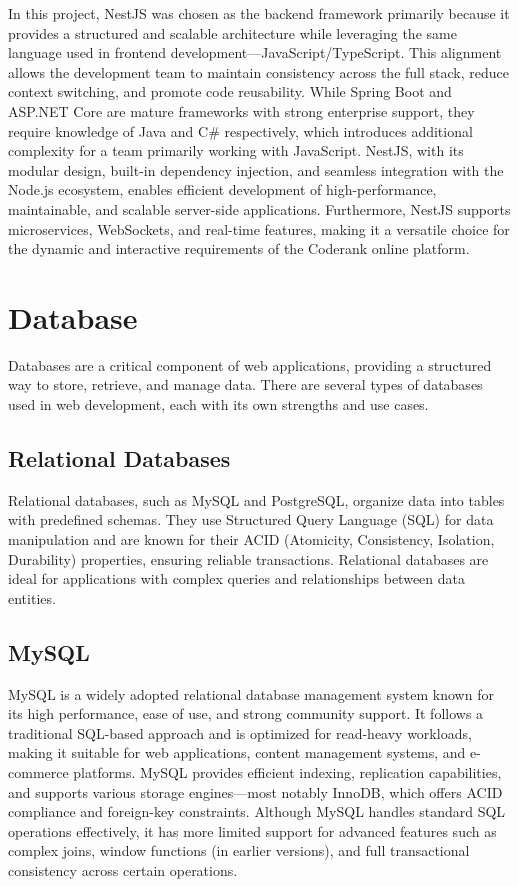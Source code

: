 In this project, NestJS was chosen as the backend framework primarily because it provides a structured and scalable architecture while leveraging the same language used in frontend development—JavaScript/TypeScript. This alignment allows the development team to maintain consistency across the full stack, reduce context switching, and promote code reusability. While Spring Boot and ASP.NET Core are mature frameworks with strong enterprise support, they require knowledge of Java and C\# respectively, which introduces additional complexity for a team primarily working with JavaScript. NestJS, with its modular design, built-in dependency injection, and seamless integration with the Node.js ecosystem, enables efficient development of high-performance, maintainable, and scalable server-side applications. Furthermore, NestJS supports microservices, WebSockets, and real-time features, making it a versatile choice for the dynamic and interactive requirements of the Coderank online platform.

\section{Database}

Databases are a critical component of web applications, providing a structured way to store, retrieve, and manage data. There are several types of databases used in web development, each with its own strengths and use cases.

\subsection{Relational Databases}

Relational databases, such as MySQL and PostgreSQL, organize data into tables with predefined schemas. They use Structured Query Language (SQL) for data manipulation and are known for their ACID (Atomicity, Consistency, Isolation, Durability) properties, ensuring reliable transactions. Relational databases are ideal for applications with complex queries and relationships between data entities.\\

\subsection*{MySQL}

MySQL is a widely adopted relational database management system known for its high performance, ease of use, and strong community support. It follows a traditional SQL-based approach and is optimized for read-heavy workloads, making it suitable for web applications, content management systems, and e-commerce platforms. MySQL provides efficient indexing, replication capabilities, and supports various storage engines—most notably InnoDB, which offers ACID compliance and foreign-key constraints. Although MySQL handles standard SQL operations effectively, it has more limited support for advanced features such as complex joins, window functions (in earlier versions), and full transactional consistency across certain operations.\cite{mysql} \\

